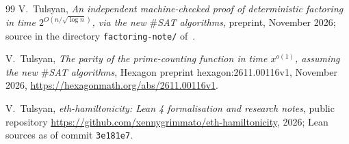 \documentclass[10pt]{amsart}
\theoremstyle{plain}
\theoremstyle{definition}
\theoremstyle{remark}
\numberwithin{equation}{section}
\begin{document}
\begin{thebibliography}{99}
V.~Tulsyan, \emph{An independent machine-checked proof of deterministic factoring in time
$2^{O(n/\sqrt{\log n})}$, via the new $\#${SAT} algorithms}, preprint, November 2026; source in the directory
\texttt{factoring-note/} of~\cite{TulsyanRepo26}.

V.~Tulsyan, \emph{The parity of the prime-counting function in time $x^{o(1)}$, assuming the new $\#${SAT}
algorithms}, Hexagon preprint hexagon:2611.00116v1, November 2026, \url{https://hexagonmath.org/abs/2611.00116v1}.

V.~Tulsyan, \emph{eth-hamiltonicity: {L}ean 4 formalisation and research notes}, public repository
\url{https://github.com/xennygrimmato/eth-hamiltonicity}, 2026; Lean sources as of commit \texttt{3e181e7}.

\end{thebibliography}

\end{document}
